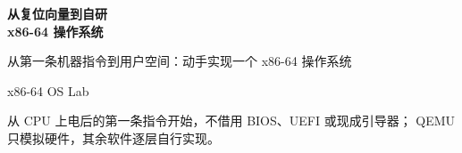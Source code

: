 \begin{titlepage}
\thispagestyle{empty}
\vspace*{2.2cm}
{\Huge\bfseries\sffamily\color{BookNavy} 从复位向量到自研\\x86-64 操作系统\par}
\vspace{0.8cm}
{\Large\sffamily\color{BookBlue}
从第一条机器指令到用户空间：动手实现一个 x86-64 操作系统\par}
\vspace{1.2cm}
{\large\sffamily x86-64 OS Lab\par}
\vfill
{\small\color{BookMuted}
从 CPU 上电后的第一条指令开始，不借用 BIOS、UEFI 或现成引导器；
QEMU 只模拟硬件，其余软件逐层自行实现。\par}
\end{titlepage}
